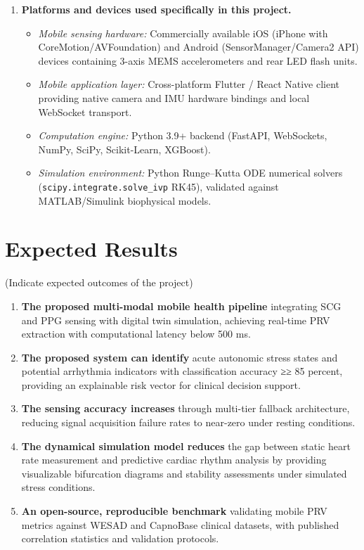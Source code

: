 \begin{enumerate}
	\item \textbf{Platforms and devices used specifically in this project.}
	\begin{itemize}
		\item \textit{Mobile sensing hardware:} Commercially available iOS
		(iPhone with CoreMotion/AVFoundation) and Android
		(SensorManager/Camera2 API) devices containing 3-axis MEMS
		accelerometers and rear LED flash units.
		\item \textit{Mobile application layer:} Cross-platform Flutter /
		React Native client providing native camera and IMU hardware
		bindings and local WebSocket transport.
		\item \textit{Computation engine:} Python 3.9+ backend (FastAPI,
		WebSockets, NumPy, SciPy, Scikit-Learn, XGBoost).
		\item \textit{Simulation environment:} Python Runge--Kutta ODE numerical
		solvers (\texttt{scipy.integrate.solve\_ivp} RK45), validated
		against MATLAB/Simulink biophysical models.
	\end{itemize}
\end{enumerate}

\section{Expected Results}
\noindent\hspace{1.5em}(Indicate expected outcomes of the project)
\begin{enumerate}
	\item \textbf{The proposed multi-modal mobile health pipeline} integrating SCG and PPG sensing with digital twin simulation, achieving real-time PRV extraction with computational latency below 500 ms.
	
	\item \textbf{The proposed system can identify} acute autonomic stress states and potential arrhythmia indicators with classification accuracy ≥≥ 85 percent, providing an explainable risk vector for clinical decision support.
	
	\item \textbf{The sensing accuracy increases} through multi-tier fallback architecture, reducing signal acquisition failure rates to near-zero under resting conditions.
	
	\item \textbf{The dynamical simulation model reduces} the gap between static heart rate measurement and predictive cardiac rhythm analysis by providing visualizable bifurcation diagrams and stability assessments under simulated stress conditions.
	
	\item \textbf{An open-source, reproducible benchmark} validating mobile PRV metrics against WESAD and CapnoBase clinical datasets, with published correlation statistics and validation protocols.
\end{enumerate}

